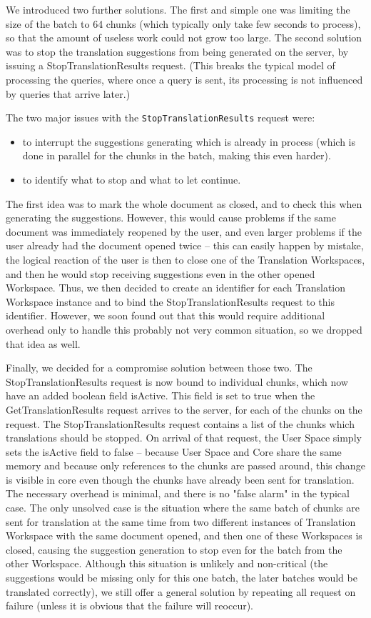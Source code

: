 We introduced two further solutions. The first and simple one was limiting the size of the batch to 64 chunks (which typically only take few seconds to process), so that the amount of useless work could not grow too large. The second solution was to stop the translation suggestions from being generated on the server, by issuing a StopTranslationResults request. (This breaks the typical model of processing the queries, where once a query is sent, its processing is not influenced by queries that arrive later.)

The two major issues with the {\tt StopTranslationResults} request were:

\begin{itemize}
	\item to interrupt the suggestions generating which is already in process (which is done in parallel for the chunks in the batch, making this even harder).
	\item to identify what to stop and what to let continue.
\end{itemize}

The first idea was to mark the whole document as closed, and to check this when generating the suggestions. However, this would cause problems if the same document was immediately reopened by the user, and even larger problems if the user already had the document opened twice -- this can easily happen by mistake, the logical reaction of the user is then to close one of the Translation Workspaces, and then he would stop receiving suggestions even in the other opened Workspace. Thus, we then decided to create an identifier for each Translation Workspace instance and to bind the StopTranslationResults request to this identifier. However, we soon found out that this would require additional overhead only to handle this probably not very common situation, so we dropped that idea as well.

Finally, we decided for a compromise solution between those two. The StopTranslationResults request is now bound to individual chunks, which now have an added boolean field isActive. This field is set to true when the GetTranslationResults request arrives to the server, for each of the chunks on the request. The StopTranslationResults request contains a list of the chunks which translations should be stopped. On arrival of that request, the User Space simply sets the isActive field to false -- because User Space and Core share the same memory and because only references to the chunks are passed around, this change is visible in core even though the chunks have already been sent for translation. The necessary overhead is minimal, and there is no "false alarm" in the typical case. The only unsolved case is the situation where the same batch of chunks are sent for translation at the same time from two different instances of Translation Workspace with the same document opened, and then one of these Workspaces is closed, causing the suggestion generation to stop even for the batch from the other Workspace. Although this situation is unlikely and non-critical (the suggestions would be missing only for this one batch, the later batches would be translated correctly), we still offer a general solution by repeating all request on failure (unless it is obvious that the failure will reoccur).

